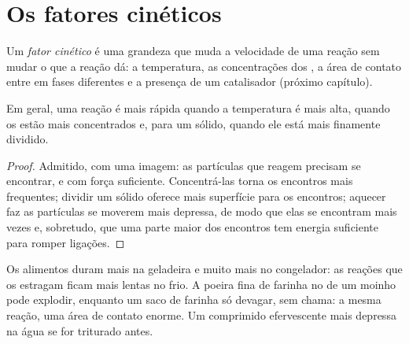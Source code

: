\section{Os fatores cinéticos}

\begin{definition}\label{def:g12:reaction-rates:kinetic-factor}
Um \emph{fator cinético} é uma grandeza que muda a
velocidade de uma reação sem mudar o que a reação dá: a temperatura, as
concentrações dos , a área de contato entre  em fases
diferentes e a presença de um catalisador (próximo capítulo).
\end{definition}

\begin{proposition}\label{prop:g12:reaction-rates:factors}
Em geral, uma reação é mais rápida quando a temperatura é mais alta,
quando os  estão mais concentrados e, para um  sólido,
quando ele está mais finamente dividido.
\end{proposition}

\begin{proof}
Admitido, com uma imagem: as partículas que reagem precisam se encontrar,
e com força suficiente. Concentrá-las torna os encontros mais
frequentes; dividir um sólido oferece mais superfície para os encontros;
aquecer faz as partículas se moverem mais depressa, de modo que elas se
encontram mais vezes e, sobretudo, que uma parte maior dos encontros tem
energia suficiente para romper ligações.
\end{proof}

\begin{example}\label{ex:g12:reaction-rates:everyday}
Os alimentos duram mais na geladeira e muito mais no congelador: as
reações que os estragam ficam mais lentas no frio. A poeira fina de
farinha no  de um moinho pode explodir, enquanto um saco de farinha
só  devagar, sem chama: a mesma reação, uma área de contato
enorme. Um comprimido efervescente  mais depressa na água se
for triturado antes.
\end{example}

